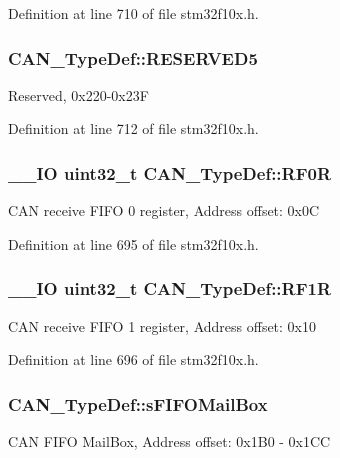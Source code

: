 Definition at line 710 of file stm32f10x.\-h.

\hypertarget{struct_c_a_n___type_def_a05b74b369ea3d9489caa4427c034c2a3}{
\subsubsection[{R\-E\-S\-E\-R\-V\-E\-D5}]{ C\-A\-N\-\_\-\-Type\-Def\-::\-R\-E\-S\-E\-R\-V\-E\-D5}}\label{struct_c_a_n___type_def_a05b74b369ea3d9489caa4427c034c2a3}
Reserved, 0x220-\/0x23\-F 

Definition at line 712 of file stm32f10x.\-h.

\hypertarget{struct_c_a_n___type_def_ad8e858479e26ab075ee2ddb630e8769d}{
\subsubsection[{R\-F0\-R}]{\setlength{\rightskip}{0pt plus 5cm}\-\_\-\-\_\-\-I\-O {\bf uint32\-\_\-t} C\-A\-N\-\_\-\-Type\-Def\-::\-R\-F0\-R}}\label{struct_c_a_n___type_def_ad8e858479e26ab075ee2ddb630e8769d}
C\-A\-N receive F\-I\-F\-O 0 register, Address offset\-: 0x0\-C 

Definition at line 695 of file stm32f10x.\-h.

\hypertarget{struct_c_a_n___type_def_a69a528d1288c1de666df68655af1d20e}{
\subsubsection[{R\-F1\-R}]{\setlength{\rightskip}{0pt plus 5cm}\-\_\-\-\_\-\-I\-O {\bf uint32\-\_\-t} C\-A\-N\-\_\-\-Type\-Def\-::\-R\-F1\-R}}\label{struct_c_a_n___type_def_a69a528d1288c1de666df68655af1d20e}
C\-A\-N receive F\-I\-F\-O 1 register, Address offset\-: 0x10 

Definition at line 696 of file stm32f10x.\-h.

\hypertarget{struct_c_a_n___type_def_a90ff90723c0ec4ae8a7028d4f3b024f4}{
\subsubsection[{s\-F\-I\-F\-O\-Mail\-Box}]{ C\-A\-N\-\_\-\-Type\-Def\-::s\-F\-I\-F\-O\-Mail\-Box}}\label{struct_c_a_n___type_def_a90ff90723c0ec4ae8a7028d4f3b024f4}
C\-A\-N F\-I\-F\-O Mail\-Box, Address offset\-: 0x1\-B0 -\/ 0x1\-C\-C 

